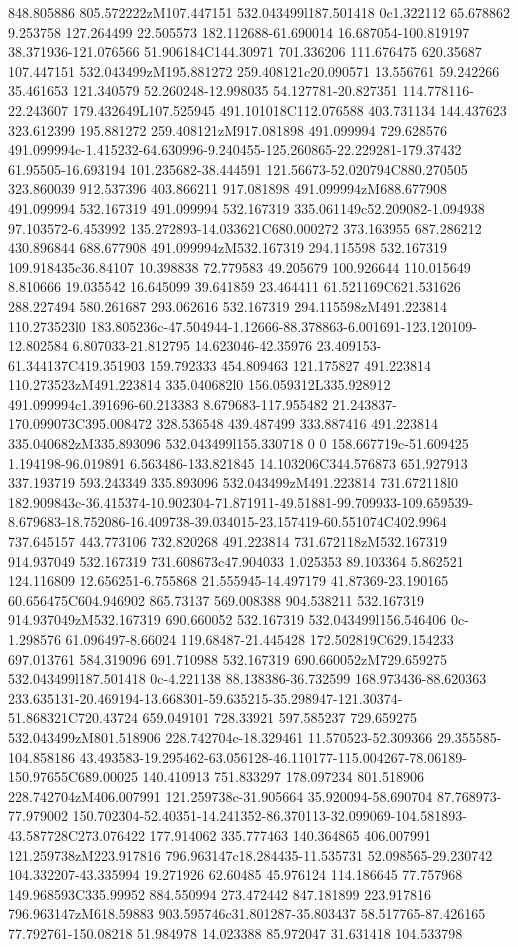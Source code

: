 848.805886 805.572222zM107.447151 532.043499l187.501418 0c1.322112 65.678862 9.253758 127.264499 22.505573 182.112688-61.690014 16.687054-100.819197 38.371936-121.076566 51.906184C144.30971 701.336206 111.676475 620.35687 107.447151 532.043499zM195.881272 259.408121c20.090571 13.556761 59.242266 35.461653 121.340579 52.260248-12.998035 54.127781-20.827351 114.778116-22.243607 179.432649L107.525945 491.101018C112.076588 403.731134 144.437623 323.612399 195.881272 259.408121zM917.081898 491.099994 729.628576 491.099994c-1.415232-64.630996-9.240455-125.260865-22.229281-179.37432 61.95505-16.693194 101.235682-38.444591 121.56673-52.020794C880.270505 323.860039 912.537396 403.866211 917.081898 491.099994zM688.677908 491.099994 532.167319 491.099994 532.167319 335.061149c52.209082-1.094938 97.103572-6.453992 135.272893-14.033621C680.000272 373.163955 687.286212 430.896844 688.677908 491.099994zM532.167319 294.115598 532.167319 109.918435c36.84107 10.398838 72.779583 49.205679 100.926644 110.015649 8.810666 19.035542 16.645099 39.641859 23.464411 61.521169C621.531626 288.227494 580.261687 293.062616 532.167319 294.115598zM491.223814 110.273523l0 183.805236c-47.504944-1.12666-88.378863-6.001691-123.120109-12.802584 6.807033-21.812795 14.623046-42.35976 23.409153-61.344137C419.351903 159.792333 454.809463 121.175827 491.223814 110.273523zM491.223814 335.040682l0 156.059312L335.928912 491.099994c1.391696-60.213383 8.679683-117.955482 21.243837-170.099073C395.008472 328.536548 439.487499 333.887416 491.223814 335.040682zM335.893096 532.043499l155.330718 0 0 158.667719c-51.609425 1.194198-96.019891 6.563486-133.821845 14.103206C344.576873 651.927913 337.193719 593.243349 335.893096 532.043499zM491.223814 731.672118l0 182.909843c-36.415374-10.902304-71.871911-49.51881-99.709933-109.659539-8.679683-18.752086-16.409738-39.034015-23.157419-60.551074C402.9964 737.645157 443.773106 732.820268 491.223814 731.672118zM532.167319 914.937049 532.167319 731.608673c47.904033 1.025353 89.103364 5.862521 124.116809 12.656251-6.755868 21.555945-14.497179 41.87369-23.190165 60.656475C604.946902 865.73137 569.008388 904.538211 532.167319 914.937049zM532.167319 690.660052 532.167319 532.043499l156.546406 0c-1.298576 61.096497-8.66024 119.68487-21.445428 172.502819C629.154233 697.013761 584.319096 691.710988 532.167319 690.660052zM729.659275 532.043499l187.501418 0c-4.221138 88.138386-36.732599 168.973436-88.620363 233.635131-20.469194-13.668301-59.635215-35.298947-121.30374-51.868321C720.43724 659.049101 728.33921 597.585237 729.659275 532.043499zM801.518906 228.742704c-18.329461 11.570523-52.309366 29.355585-104.858186 43.493583-19.295462-63.056128-46.110177-115.004267-78.06189-150.97655C689.00025 140.410913 751.833297 178.097234 801.518906 228.742704zM406.007991 121.259738c-31.905664 35.920094-58.690704 87.768973-77.979002 150.702304-52.40351-14.241352-86.370113-32.099069-104.581893-43.587728C273.076422 177.914062 335.777463 140.364865 406.007991 121.259738zM223.917816 796.963147c18.284435-11.535731 52.098565-29.230742 104.332207-43.335994 19.271926 62.60485 45.976124 114.186645 77.757968 149.968593C335.99952 884.550994 273.472442 847.181899 223.917816 796.963147zM618.59883 903.595746c31.801287-35.803437 58.517765-87.426165 77.792761-150.08218 51.984978 14.023388 85.972047 31.631418 104.533798 